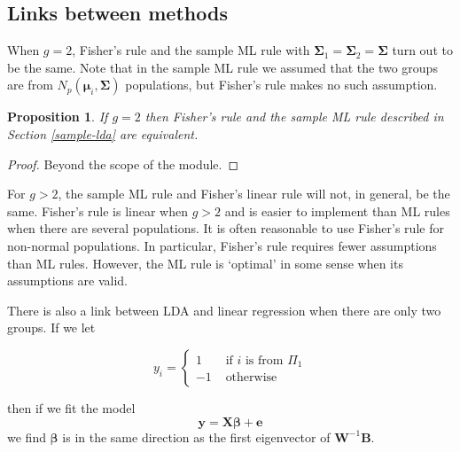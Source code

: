 \documentclass[
]{book}
\newtheorem{proposition}{Proposition}[chapter]
\theoremstyle{definition}
\theoremstyle{definition}
\theoremstyle{definition}
\theoremstyle{definition}
\theoremstyle{remark}
\begin{document}
\hypertarget{links-between-methods}{%
\subsection{Links between methods}\label{links-between-methods}}

When \(g=2\), Fisher's rule and the sample ML rule with \(\boldsymbol{\Sigma}_1=\boldsymbol{\Sigma}_2=\boldsymbol{\Sigma}\) turn out to be the same. Note that in
the sample ML rule we assumed that the two groups are from \(N_p({\boldsymbol{\mu}}_i, \boldsymbol{\Sigma})\)
populations, but Fisher's rule makes no such assumption.

\begin{proposition}
\protect\hypertarget{prp:nine3}{}{\label{prp:nine3} }If \(g=2\) then Fisher's rule and the sample ML rule described in Section \ref{sample-lda} are equivalent.
\end{proposition}

\begin{proof}
Beyond the scope of the module.
\end{proof}

For \(g > 2\), the sample ML rule and Fisher's linear rule will not, in general, be the same. Fisher's rule is linear when \(g>2\) and is easier to implement than ML rules when there are several populations. It is often reasonable to use Fisher's rule for non-normal populations. In particular, Fisher's rule requires fewer assumptions than ML rules. However, the ML rule is `optimal' in some sense when its assumptions are valid.

There is also a link between LDA and linear regression when there are only two groups. If we let

\[
y_i = \begin{cases} 1 &\mbox{ if }i \mbox{ is from } \Pi_1\\
-1 &\mbox{ otherwise}
\end{cases}
\]

then if we fit the model
\[\mathbf y= \mathbf X\boldsymbol \beta+ \mathbf e\]
we find \(\boldsymbol \beta\) is in the same direction as the first eigenvector of \(\mathbf W^{-1}\mathbf B\).
\end{document}
